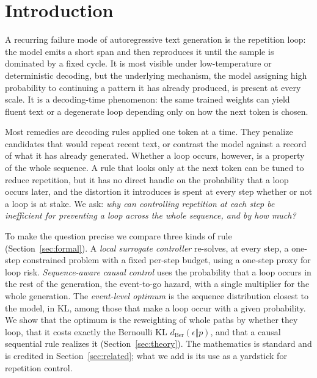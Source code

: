\documentclass[11pt]{article}
\begin{document}
\tableofcontents

\section{Introduction}

A recurring failure mode of autoregressive text generation is the repetition loop: the model emits a short span and then reproduces it until the sample is dominated by a fixed cycle. It is most visible under low-temperature or deterministic decoding, but the underlying mechanism, the model assigning high probability to continuing a pattern it has already produced, is present at every scale. It is a decoding-time phenomenon: the same trained weights can yield fluent text or a degenerate loop depending only on how the next token is chosen.

Most remedies are decoding rules applied one token at a time. They penalize candidates that would repeat recent text, or contrast the model against a record of what it has already generated. Whether a loop occurs, however, is a property of the whole sequence. A rule that looks only at the next token can be tuned to reduce repetition, but it has no direct handle on the probability that a loop occurs later, and the distortion it introduces is spent at every step whether or not a loop is at stake. We ask: \emph{why can controlling repetition at each step be inefficient for preventing a loop across the whole sequence, and by how much?}

To make the question precise we compare three kinds of rule (Section~\ref{sec:formal}). A \emph{local surrogate controller} re-solves, at every step, a one-step constrained problem with a fixed per-step budget, using a one-step proxy for loop risk. \emph{Sequence-aware causal control} uses the probability that a loop occurs in the rest of the generation, the event-to-go hazard, with a single multiplier for the whole generation. The \emph{event-level optimum} is the sequence distribution closest to the model, in KL, among those that make a loop occur with a given probability. We show that the optimum is the reweighting of whole paths by whether they loop, that it costs exactly the Bernoulli KL $d_{\mathrm{Ber}}(\epsilon\Vert p)$, and that a causal sequential rule realizes it (Section~\ref{sec:theory}). The mathematics is standard and is credited in Section~\ref{sec:related}; what we add is its use as a yardstick for repetition control.
\end{document}
